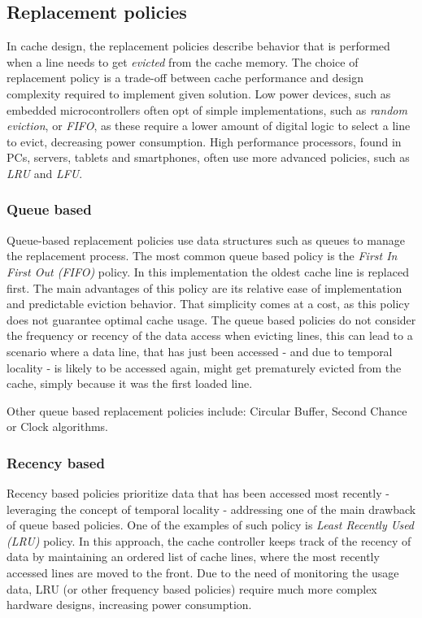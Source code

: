 %
\subsection{Replacement policies} \label{sec:eviction_policies}
In cache design, the replacement policies describe behavior that is performed when a line needs to get \textit{evicted} from the cache memory.
The choice of replacement policy is a trade-off between cache performance and design complexity required to implement given solution. Low power
devices, such as embedded microcontrollers often opt of simple implementations, such as \textit{random eviction}, or \textit{FIFO}, as these require %
a lower amount of digital logic to select a line to evict, decreasing power consumption. High performance processors, found in PCs, servers, tablets and smartphones,
often use more advanced policies, such as \textit{LRU} and \textit{LFU}.

\subsubsection{Queue based}
Queue-based replacement policies use data structures such as queues to manage the replacement process. The most common queue based policy is the
\textit{First In First Out (FIFO)} policy. In this implementation the oldest cache line is replaced first. The main advantages of this policy are  %
its relative ease of implementation and predictable eviction behavior. That simplicity comes at a cost, as this policy does not guarantee optimal cache usage. The queue
based policies do not consider the frequency or recency of the data access when evicting lines, this can lead to a scenario where a data line, that has just been accessed - and due to
temporal locality - is likely to be accessed again, might get prematurely evicted from the cache, simply because it was the first loaded line.

\vspace{10px}\noindent Other queue based replacement policies include: Circular Buffer, Second Chance or Clock algorithms. %

\subsubsection{Recency based}
Recency based policies prioritize data that has been accessed most recently - leveraging the concept of temporal locality - addressing one of
the main drawback of queue based policies. One of the examples of such policy is \textit{Least Recently Used (LRU)} policy. In this approach, the cache controller
keeps track of the recency of data by maintaining an ordered list of cache lines, where the most recently accessed lines are moved to the front. Due to the need of monitoring
the usage data, LRU (or other frequency based policies) require much more complex hardware designs, increasing power consumption. 

